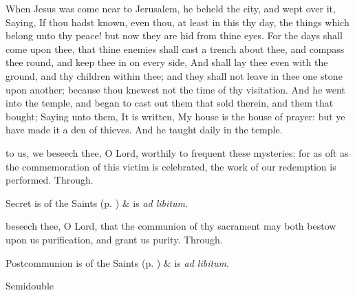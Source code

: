
 When Jesus was come near to Jerusalem, he beheld the city, and wept over it, Saying, If thou hadst known, even thou, at least in this thy day, the things which belong unto thy peace! but now they are hid from thine eyes. For the days shall come upon thee, that thine enemies shall cast a trench about thee, and compass thee round, and keep thee in on every side, And shall lay thee even with the ground, and thy children within thee; and they shall not leave in thee one stone upon another; because thou knewest not the time of thy visitation. And he went into the temple, and began to cast out them that sold therein, and them that bought; Saying unto them, It is written, My house is the house of prayer: but ye have made it a den of thieves. And he taught daily in the temple.


\secret
{} to us, we beseech thee, O Lord, worthily to frequent these mysteries: for as oft as the commemoration of this victim is celebrated, the work of our redemption is performed. Through.
\begin{rubric}
     Secret is of the Saints (p. \pageref{SPSaints}) \&  is \emph{ad libitum}.
\end{rubric}


\postcommunion
{} beseech thee, O Lord, that the communion of thy sacrament may both bestow upon us purification, and grant us purity. Through.
\begin{rubric}
     Postcommunion is of the Saints (p. \pageref{SPSaints}) \&  is \emph{ad libitum}.
\end{rubric}



\begin{inhead}
{Semidouble}
\end{inhead}
\par\noindent

